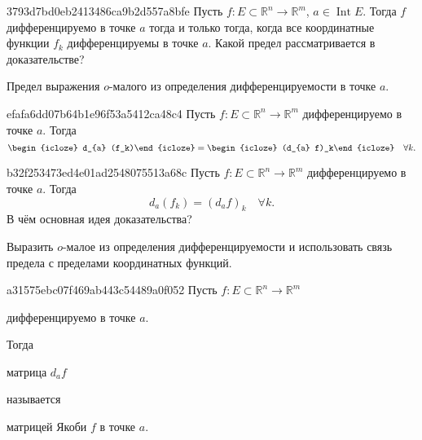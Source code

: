 \begin{note}{3793d7bd0eb2413486ca9b2d557a8bfe}
    Пусть \({ f : E \subset \mathbb R^{n} \to \mathbb R^{m} }\),\: \({ a \in \operatorname{Int} E }\).
    Тогда \({ f }\) дифференцируемо в точке \({ a }\) тогда и только тогда, когда все координатные функции \({ f_k }\) дифференцируемы в точке \({ a }\).
    Какой предел рассматривается в доказательстве?

    \begin{cloze}{1}
        Предел выражения \({ o }\)-малого из определения дифференцируемости в точке \({ a }\).
    \end{cloze}
\end{note}

\begin{note}{efafa6dd07b64b1e96f53a5412ca48c4}
    Пусть \({ f : E \subset \mathbb R^{n} \to \mathbb R^{m} }\) дифференцируемо в точке \({ a }\).
    Тогда
    \[
        \begin{icloze}{2}d_{a} (f_k)\end{icloze} = \begin{icloze}{1}(d_{a} f)_k\end{icloze} \quad \forall k.
    \]
\end{note}

\begin{note}{b32f253473ed4e01ad2548075513a68c}
    Пусть \({ f : E \subset \mathbb R^{n} \to \mathbb R^{m} }\) дифференцируемо в точке \({ a }\).
    Тогда
    \[
        d_{a} (f_k) = (d_{a} f)_k \quad \forall k.
    \]
    В чём основная идея доказательства?

    \begin{cloze}{1}
        Выразить \({ o }\)-малое из определения дифференцируемости и использовать связь предела с пределами координатных функций.
    \end{cloze}
\end{note}

\begin{note}{a31575ebc07f469ab443c54489a0f052}
    Пусть \({ f : E \subset \mathbb R^{n} \to \mathbb R^{m} }\) \begin{icloze}{3}дифференцируемо в точке \({ a }\).\end{icloze}
    Тогда \begin{icloze}{1}матрица \({ d_{a}f }\)\end{icloze} называется \begin{icloze}{2}матрицей Якоби \({ f }\) в точке \({ a }\).\end{icloze}
\end{note}


